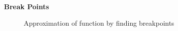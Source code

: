 \textbf{Break Points}

\begin{figure}
\centering

  \caption{Approximation of function by finding breakpoints}
\label{fig:break}
\end{figure}
